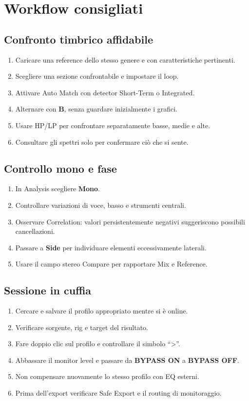 \documentclass[11pt,a4paper]{article}
\newcommand{\control}[1]{\textbf{\textsf{#1}}}
\begin{document}
\section{Workflow consigliati}

\subsection{Confronto timbrico affidabile}

\begin{enumerate}
  \item Caricare una reference dello stesso genere e con caratteristiche
  pertinenti.
  \item Scegliere una sezione confrontabile e impostare il loop.
  \item Attivare Auto Match con detector Short-Term o Integrated.
  \item Alternare con \control{B}, senza guardare inizialmente i grafici.
  \item Usare HP/LP per confrontare separatamente basse, medie e alte.
  \item Consultare gli spettri solo per confermare ciò che si sente.
\end{enumerate}

\subsection{Controllo mono e fase}

\begin{enumerate}
  \item In Analysis scegliere \control{Mono}.
  \item Controllare variazioni di voce, basso e strumenti centrali.
  \item Osservare Correlation: valori persistentemente negativi suggeriscono
  possibili cancellazioni.
  \item Passare a \control{Side} per individuare elementi eccessivamente
  laterali.
  \item Usare il campo stereo Compare per rapportare Mix e Reference.
\end{enumerate}

\subsection{Sessione in cuffia}

\begin{enumerate}
  \item Cercare e salvare il profilo appropriato mentre si è online.
  \item Verificare sorgente, rig e target del risultato.
  \item Fare doppio clic sul profilo e controllare il simbolo ``\textgreater''.
  \item Abbassare il monitor level e passare da \control{BYPASS ON} a
  \control{BYPASS OFF}.
  \item Non compensare nuovamente lo stesso profilo con EQ esterni.
  \item Prima dell'export verificare Safe Export e il routing di monitoraggio.
\end{enumerate}
\end{document}
